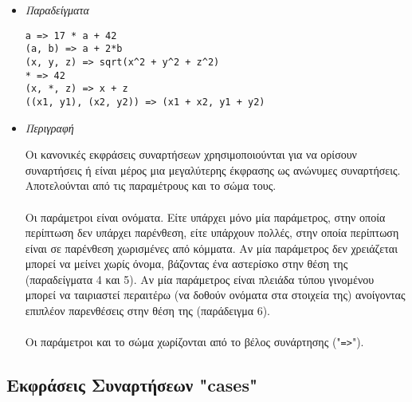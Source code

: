 \documentclass[diploma]{softlab-thesis}
\begin{document}
\begin{itemize}
\item \textit{Παραδείγματα}

\begin{verbatim}
a => 17 * a + 42
(a, b) => a + 2*b
(x, y, z) => sqrt(x^2 + y^2 + z^2)
* => 42
(x, *, z) => x + z
((x1, y1), (x2, y2)) => (x1 + x2, y1 + y2)
\end{verbatim}

\item \textit{Περιγραφή}

Οι κανονικές εκφράσεις συναρτήσεων χρησιμοποιούνται για να ορίσουν συναρτήσεις
ή είναι μέρος μια μεγαλύτερης έκφρασης ως ανώνυμες συναρτήσεις. Αποτελούνται
από τις παραμέτρους και το σώμα τους.
\\\\
Οι παράμετροι είναι ονόματα. Είτε υπάρχει μόνο μία παράμετρος, στην οποία
περίπτωση δεν υπάρχει παρένθεση, είτε υπάρχουν πολλές, στην οποία περίπτωση
είναι σε παρένθεση χωρισμένες από κόμματα. Αν μία παράμετρος δεν χρειάζεται
μπορεί να μείνει χωρίς όνομα, βάζοντας ένα αστερίσκο στην θέση της
(παραδείγματα 4 και 5). Αν μία παράμετρος είναι πλειάδα τύπου γινομένου
μπορεί να ταιριαστεί περαιτέρω (να δοθούν ονόματα στα στοιχεία της) ανοίγοντας
επιπλέον παρενθέσεις στην θέση της (παράδειγμα 6).
\\\\
Οι παράμετροι και το σώμα χωρίζονται από το βέλος συνάρτησης ("\verb|=>|").

\end{itemize}

\newpage
\subsection{Εκφράσεις Συναρτήσεων "cases"}
\label{subsubsec:casessyntaxgr}
\end{document}
